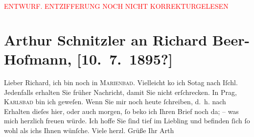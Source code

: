 
\begin{center}
            \textcolor{red}{ENTWURF. ENTZIFFERUNG NOCH NICHT KORREKTURGELESEN}
                      \end{center}
            
               \section[Arthur Schnitzler an Richard Beer-Hofmann, {[}10. 7. 1895?{]}]{ Arthur Schnitzler an Richard Beer-Hofmann, {[}10. 7. 1895?{]}}\nopagebreak{}\rehead{ }\begin{ledgroupsized}[t]{13cm}\normalsize\beginnumbering{} \toendnotes[C]{\smallbreak\pagebreak[2]} 
\pstart
           \noindent{}{\pb}Lieber Richard, ich bin noch in \textsc{Marienbad}. Vielleicht ko{\geminationm} ich So{\geminationn}tag nach Iſchl. Jedenfalls erhalten Sie früher Nachricht, damit Sie nicht
               erſchrecken. In Prag, \textsc{Karlsbad} bin ich geweſen. Wenn Sie mir {\pb}noch heute
               ſchreiben, d. h. nach Erhalten dieſes hier, oder auch morgen, ſo beko{\geminationm} ich Ihren Brief noch da; – was mich herzlich freuen
               würde. Ich hoffe Sie ſind tief im Liebling und
               befinden ſich ſo wohl als ichs Ihnen wünſche.\pend
           \pstart Viele herzl. Grüße Ihr \spacefill\mbox{Arth}\pend{}\endnumbering{}\end{ledgroupsized}  \newcommand{\dateiname}{L00461}\newcommand{\titel}{Arthur Schnitzler an Richard Beer-Hofmann, [10. 7. 1895?]}\newcommand{\editorInnen}{Martin Anton Müller und Gerd-Hermann Susen}
      